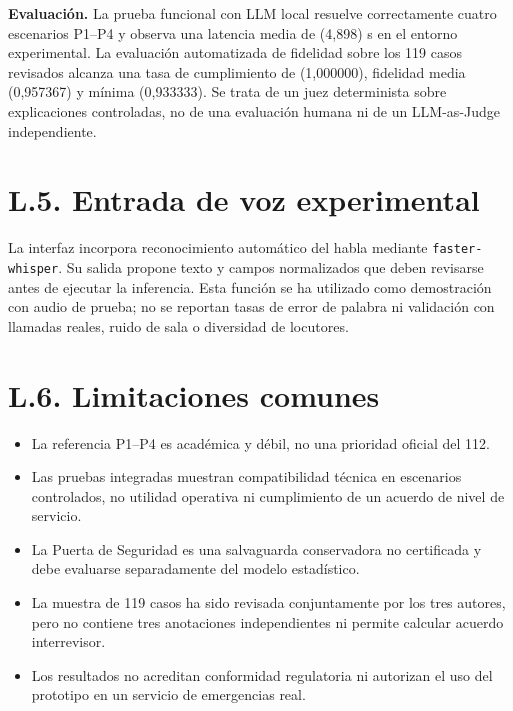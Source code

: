 \textbf{Evaluación.} La prueba funcional con LLM local resuelve correctamente cuatro
escenarios P1--P4 y observa una latencia media de (4{,}898) s en el entorno
experimental. La evaluación automatizada de fidelidad sobre los 119 casos revisados
alcanza una tasa de cumplimiento de (1{,}000000), fidelidad media (0{,}957367) y
mínima (0{,}933333). Se trata de un juez determinista sobre explicaciones controladas,
no de una evaluación humana ni de un LLM-as-Judge independiente.

\section*{L.5. Entrada de voz experimental}

La interfaz incorpora reconocimiento automático del habla mediante
\texttt{faster-whisper}. Su salida propone texto y campos normalizados que deben
revisarse antes de ejecutar la inferencia. Esta función se ha utilizado como demostración
con audio de prueba; no se reportan tasas de error de palabra ni validación con llamadas
reales, ruido de sala o diversidad de locutores.

\section*{L.6. Limitaciones comunes}

\begin{itemize}
    \item La referencia P1--P4 es académica y débil, no una prioridad oficial del 112.
    \item Las pruebas integradas muestran compatibilidad técnica en escenarios
    controlados, no utilidad operativa ni cumplimiento de un acuerdo de nivel de servicio.
    \item La Puerta de Seguridad es una salvaguarda conservadora no certificada y debe
    evaluarse separadamente del modelo estadístico.
    \item La muestra de 119 casos ha sido revisada conjuntamente por los tres autores,
    pero no contiene tres anotaciones independientes ni permite calcular acuerdo
    interrevisor.
    \item Los resultados no acreditan conformidad regulatoria ni autorizan el uso del
    prototipo en un servicio de emergencias real.
\end{itemize}
